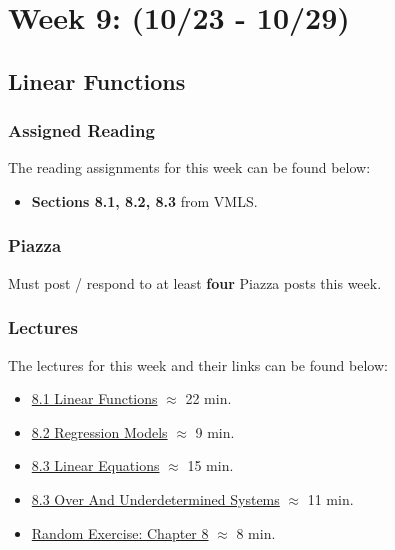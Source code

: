 \clearpage
\chapter{Week 9: (10/23 - 10/29)}

\section{Linear Functions}

\subsection{Assigned Reading}

The reading assignments for this week can be found below:

\begin{itemize}
    \item \textbf{Sections 8.1, 8.2, 8.3} from VMLS.
\end{itemize}

\subsection{Piazza}

Must post / respond to at least \textbf{four} Piazza posts this week.  

\subsection{Lectures}

The lectures for this week and their links can be found below:

\begin{itemize}
    \item \href{https://applied.cs.colorado.edu/mod/hvp/view.php?id=50757}{8.1 Linear Functions} $\approx$ 22 min.
    \item \href{https://applied.cs.colorado.edu/mod/hvp/view.php?id=50758}{8.2 Regression Models} $\approx$ 9 min.
    \item \href{https://applied.cs.colorado.edu/mod/hvp/view.php?id=50759}{8.3 Linear Equations} $\approx$ 15 min.
    \item \href{https://applied.cs.colorado.edu/mod/hvp/view.php?id=50760}{8.3 Over And Underdetermined Systems} $\approx$ 11 min.
    \item \href{https://applied.cs.colorado.edu/mod/hvp/view.php?id=50761}{Random Exercise: Chapter 8} $\approx$ 8 min.
\end{itemize}

